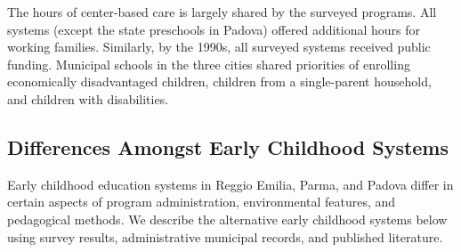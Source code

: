 The hours of center-based care is largely shared by the surveyed programs. All systems (except the state preschools in Padova) offered additional hours for working families. Similarly, by the 1990s, all surveyed systems received public funding. Municipal schools in the three cities shared priorities of enrolling economically disadvantaged children, children from a single-parent household, and children with disabilities. 
 

 

\subsection{Differences Amongst Early Childhood Systems}

Early childhood education systems in Reggio Emilia, Parma, and Padova differ in certain aspects of program administration, environmental features, and pedagogical methods. We describe the alternative early childhood systems below using survey results, administrative municipal records, and published literature.

